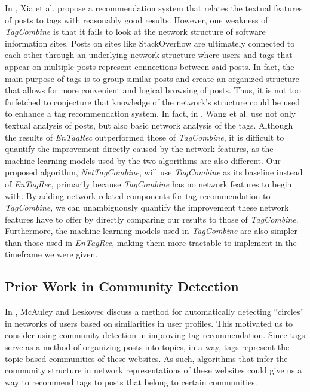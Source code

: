 \documentclass[10pt]{IEEEtran}
\begin{document}
In \cite{1}, Xia et al. propose a recommendation system that relates the textual features of posts to tags with reasonably good results. However, one weakness of \textit{TagCombine} is that it fails to look at the network structure of software information sites. Posts on sites like StackOverflow are ultimately connected to each other through an underlying network structure where users and tags that appear on multiple posts represent connections between said posts. In fact, the main purpose of tags is to group similar posts and create an organized structure that allows for more convenient and logical browsing of posts. Thus, it is not too farfetched to conjecture that knowledge of the network’s structure could be used to enhance a tag recommendation system. In fact, in \cite{2}, Wang et al. use not only textual analysis of posts, but also basic network analysis of the tags.  Although the results of \textit{EnTagRec} outperformed those of \textit{TagCombine}, it is difficult to quantify the improvement directly caused by the network features, as the machine learning models used by the two algorithms are also different. Our proposed algorithm, \textit{NetTagCombine}, will use \textit{TagCombine} as its baseline instead of \textit{EnTagRec}, primarily because \textit{TagCombine} has no network features to begin with. By adding network related components for tag recommendation to \textit{TagCombine}, we can unambiguously quantify the improvement these network features have to offer by directly comparing our results to those of \textit{TagCombine}. Furthermore, the machine learning models used in \textit{TagCombine} are also simpler than those used in \textit{EnTagRec}, making them more tractable to implement in the timeframe we were given.

\subsection{Prior Work in Community Detection}

In \cite{3}, McAuley and Leskovec discuss a method for automatically detecting ``circles'' in networks of users based on similarities in user profiles. This motivated us to consider using community detection in improving tag recommendation. Since tags serve as a method of organizing posts into topics, in a way, tags represent the topic-based communities of these websites. As such, algorithms that infer the community structure in network representations of these websites could give us a way to recommend tags to posts that belong to certain communities.
\end{document}
